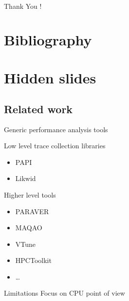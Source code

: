 \documentclass[xcolor={usenames,dvipsnames},hyperref={pdfusetitle}]{beamer}
\begin{document}
\setcounter{finalframe}{\value{framenumber}}

\begin{frame}{}
    \centering
    \Huge
    Thank You !
\end{frame}

\section*{Bibliography}
%



\section*{Hidden slides}

\subsection*{Related work}
\setcounter{framenumber}{\value{finalframe}}
\begin{frame}{Generic performance analysis tools}
    \begin{block}{Low level trace collection libraries}
        \begin{itemize}
            \item PAPI~\cite{Browne00Portable}
            \item Likwid~\cite{Treibig10LIKWID}
        \end{itemize}
    \end{block}
    \pause
    \begin{block}{Higher level tools}
        \begin{itemize}
            \item PARAVER~\cite{Pillet95PARAVER}
            \item MAQAO~\cite{Djoudi05MAQAO}
            \item VTune~\cite{Reinders05VTune}
            \item HPCToolkit~\cite{Adhianto10HPCTOOLKIT}
            \item \ldots
        \end{itemize}
    \end{block}
    \pause
    \begin{alertblock}{Limitations}
        Focus on CPU point of view
    \end{alertblock}
\end{frame}
\end{document}

